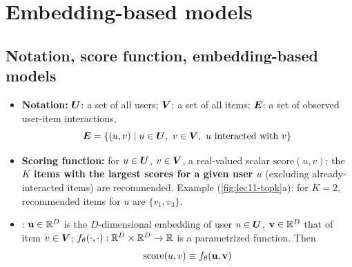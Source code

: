 \section{Embedding-based models}\label{sec:lec11-emb}

\subsection{Notation, score function, embedding-based models}\label{sec:lec11-notation}

\begin{itemize}
  \item \textbf{Notation:} $\bm{U}$: a set of all users; $\bm{V}$: a set of all
    items; $\bm{E}$: a set of observed user-item interactions,
    \begin{equation}\label{eq:lec11-E}
      \bm{E}=\{(u,v)\mid u\in\bm{U},\ v\in\bm{V},\ u\text{ interacted with }v\}
    \end{equation}
  \item \textbf{Scoring function:} for $u\in\bm{U}$, $v\in\bm{V}$, a real-valued
    scalar $\mathrm{score}(u,v)$; the \textbf{$K$ items with the largest scores
    for a given user $u$} (excluding already-interacted items) are recommended.
    Example (\cref{fig:lec11-topk}a): for $K=2$, recommended items for $u$ are
    $\{v_1,v_3\}$.
  \item {}: $\mathbf{u}\in\mathbb{R}^D$ is the $D$-dimensional
    embedding of user $u\in\bm{U}$, $\mathbf{v}\in\mathbb{R}^D$ that of item $v\in\bm{V}$;
    $f_\theta(\cdot,\cdot):\mathbb{R}^D\times\mathbb{R}^D\to\mathbb{R}$ is a parametrized function.
    Then
    \begin{equation}\label{eq:lec11-score}
      \mathrm{score}(u,v)\equiv f_\theta(\mathbf{u},\mathbf{v})
    \end{equation}
\end{itemize}

